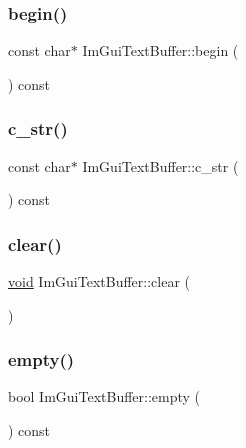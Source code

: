 \subsubsection{\texorpdfstring{begin()}{begin()}}
{\footnotesize\ttfamily const char$\ast$ Im\+Gui\+Text\+Buffer\+::begin (\begin{DoxyParamCaption}{ }\end{DoxyParamCaption}) const\hspace{0.3cm}{\ttfamily [inline]}}

\mbox{\label{structImGuiTextBuffer_afb03439bc91723e274bfb9d247a691b9}} 
\subsubsection{\texorpdfstring{c\+\_\+str()}{c\_str()}}
{\footnotesize\ttfamily const char$\ast$ Im\+Gui\+Text\+Buffer\+::c\+\_\+str (\begin{DoxyParamCaption}{ }\end{DoxyParamCaption}) const\hspace{0.3cm}{\ttfamily [inline]}}

\mbox{\label{structImGuiTextBuffer_a9e4edc9f950bc9e35d5c3b3071dbc0df}} 
\subsubsection{\texorpdfstring{clear()}{clear()}}
{\footnotesize\ttfamily \hyperlink{imgui__impl__opengl3__loader_8h_ac668e7cffd9e2e9cfee428b9b2f34fa7}{void} Im\+Gui\+Text\+Buffer\+::clear (\begin{DoxyParamCaption}{ }\end{DoxyParamCaption})\hspace{0.3cm}{\ttfamily [inline]}}

\mbox{\label{structImGuiTextBuffer_affd606443a661cd0fcce0d381bc8cf98}} 
\subsubsection{\texorpdfstring{empty()}{empty()}}
{\footnotesize\ttfamily bool Im\+Gui\+Text\+Buffer\+::empty (\begin{DoxyParamCaption}{ }\end{DoxyParamCaption}) const\hspace{0.3cm}{\ttfamily [inline]}}

